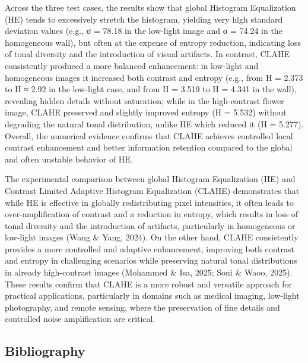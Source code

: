 \documentclass[11pt]{article}
\begin{document}
Across the three test cases, the results show that global Histogram
Equalization (HE) tends to excessively stretch the histogram, yielding
very high standard deviation values (e.g., σ = 78.18 in the low-light
image and σ = 74.24 in the homogeneous wall), but often at the expense
of entropy reduction, indicating loss of tonal diversity and the
introduction of visual artifacts. In contrast, CLAHE consistently
produced a more balanced enhancement: in low-light and homogeneous
images it increased both contrast and entropy (e.g., from H = 2.373 to H
≈ 2.92 in the low-light case, and from H = 3.519 to H = 4.341 in the
wall), revealing hidden details without saturation; while in the
high-contrast flower image, CLAHE preserved and slightly improved
entropy (H = 5.532) without degrading the natural tonal distribution,
unlike HE which reduced it (H = 5.277). Overall, the numerical evidence
confirms that CLAHE achieves controlled local contrast enhancement and
better information retention compared to the global and often unstable
behavior of HE.

The experimental comparison between global Histogram Equalization (HE)
and Contrast Limited Adaptive Histogram Equalization (CLAHE)
demonstrates that while HE is effective in globally redistributing pixel
intensities, it often leads to over-amplification of contrast and a
reduction in entropy, which results in loss of tonal diversity and the
introduction of artifacts, particularly in homogeneous or low-light
images (Wang \& Yang, 2024). On the other hand, CLAHE consistently
provides a more controlled and adaptive enhancement, improving both
contrast and entropy in challenging scenarios while preserving natural
tonal distributions in already high-contrast images (Mohammed \& Isa,
2025; Soni \& Waoo, 2025). These results confirm that CLAHE is a more
robust and versatile approach for practical applications, particularly
in domains such as medical imaging, low-light photography, and remote
sensing, where the preservation of fine details and controlled noise
amplification are critical.

    \hypertarget{bibliography}{%
\subsection{Bibliography}\label{bibliography}}
\end{document}
